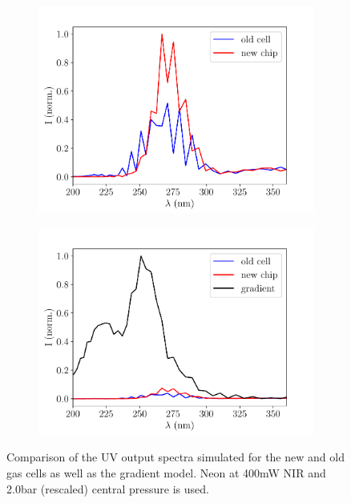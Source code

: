 \documentclass[a4paper]{jpconf}
\begin{document}
\begin{figure}[h]
\centering
 \begin{subfigure}{0.5\textwidth}
\includegraphics[width=\textwidth]{im/Ne_old_v_new}
\caption{}\label{im:coms_Ne}
\end{subfigure}
\begin{subfigure}{0.5\textwidth}
\includegraphics[width=\textwidth]{im/Ne_old_v_new_v_grad}
\caption{}\label{im:coms_Ne_grad}
\end{subfigure}
\caption{Comparison of the UV output spectra simulated for the new and old gas cells as well as the gradient model. Neon at 400mW NIR and 2.0bar (rescaled) central pressure is used.}\label{im:coms}
\end{figure}
\end{document}
